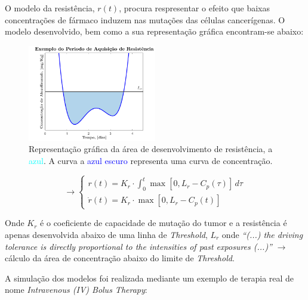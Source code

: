 O modelo da resistência, $r(t)$, procura respresentar o efeito que baixas concentrações de fármaco induzem nas mutações das células cancerígenas. O modelo desenvolvido, bem como a sua representação gráfica encontram-se abaixo:
\newpage
\begin{figure}
    \centering
    \vspace{0.55 em}\includegraphics[width=0.5\textwidth]{img/perguntas/P6/P6-AreaMutation.png}
    \caption{Representação gráfica da área de desenvolvimento de resistência, a \textcolor{cyan}{azul}. A curva a \textcolor{blue}{azul escuro} representa uma curva de concentração.}
    \label{fig:P6-area}
\end{figure}

$$
    \xrightarrow[]{}
    \begin{cases}
        r(t) = K_r \cdot \int_{0}^{t} \max[0, L_r - C_p(\tau)] \,d\tau \\
        \dot{r}(t) = K_r \cdot \max[0, L_r - C_p(t)]
    \end{cases}
$$

Onde $K_r$ é o coeficiente de capacidade de mutação do tumor\cite{toxicity-lemos} e a resistência é apenas desenvolvida abaixo de uma linha de \textit{Threshold}, $L_r$ onde \textit{``(...) the driving tolerance is directly proportional to the intensities of past exposures (...)''}\cite{Porchet1988-bs} $\rightarrow$ cálculo da área de concentração abaixo do limite de \textit{Threshold}.

A simulação dos modelos foi realizada mediante um exemplo de terapia real de nome \textit{Intravenous (IV) Bolus Therapy}\footnotemark[10]\cite{teles_2017}:

